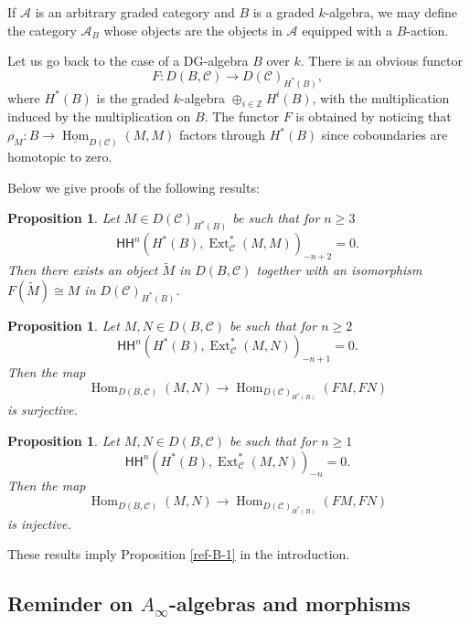 \documentclass{amsart}
\numberwithin{equation}{section}
\let\cal\mathcal
\let\blb\mathbb
\newtheorem{propositions}[lemmas]{Proposition}
\theoremstyle{definition}
\theoremstyle{remark}
\begin{document}
If ${{\cal A}}$ is an arbitrary graded category and $B$ is a graded $k$-algebra, 
we may define the category ${{\cal A}}_{B}$ whose objects are the objects in ${{\cal A}}$
equipped with a $B$-action. 

Let us go back to the case of a DG-algebra $B$ over $k$. There is an obvious functor
\[
F:D(B,{{\cal C}}){\rightarrow} D({{\cal C}})_{H^\ast(B)},
\]
where $H^*(B)$ is the graded $k$-algebra $\oplus_{i\in{{\blb Z}}}H^i(B)$, with the multiplication induced by the multiplication on $B$. The functor $F$ is obtained by noticing that $\rho_M:B\to \underline{\operatorname {Hom}}_{D({{\cal C}})}(M,M)$ factors through $H^*(B)$ since coboundaries are homotopic to zero.

Below we give proofs of the following results:
\begin{propositions} 
\label{ref-9.1.1-48}
Let $M\in D({{\cal C}})_{H^\ast(B)}$ be such that for $n\ge 3$
\[
{\mathsf{HH}}^n(H^\ast(B),{\operatorname {Ext}}^\ast_{{\cal C}}(M,M))_{-n+2}=0.
\]
Then there exists an object $\tilde{M}$ in $D(B,{{\cal C}})$ together
with an isomorphism $F(\tilde{M})\cong M$ in $D({{\cal C}})_{H^\ast(B)}$.
\end{propositions}
\begin{propositions}
\label{ref-9.1.2-49}
Let $M,N\in D(B,{{\cal C}})$ be such that for $n\ge 2$
\[
{\mathsf{HH}}^n(H^\ast(B),{\operatorname {Ext}}^\ast_{{\cal C}}(M,N))_{-n+1}=0.
\]
Then the map
\[
{\operatorname {Hom}}_{D(B,{{\cal C}})}(M,N){\rightarrow}{\operatorname {Hom}}_{D({{\cal C}})_{H^\ast(B)}}(FM,FN)
\]
is surjective.
\end{propositions}
\begin{propositions}
\label{ref-9.1.3-50}
Let $M,N\in D(B,{{\cal C}})$ be such that for $n\ge 1$
\[
{\mathsf{HH}}^n(H^\ast(B),{\operatorname {Ext}}^\ast_{{\cal C}}(M,N))_{-n}=0.
\]
Then the map
\[
{\operatorname {Hom}}_{D(B,{{\cal C}})}(M,N){\rightarrow}{\operatorname {Hom}}_{D({{\cal C}})_{H^\ast(B)}}(FM,FN)
\]
is injective.
\end{propositions}
These results imply Proposition \ref{ref-B-1} in the introduction.
\subsection{Reminder on $A_\infty$-algebras and morphisms}
\end{document}
